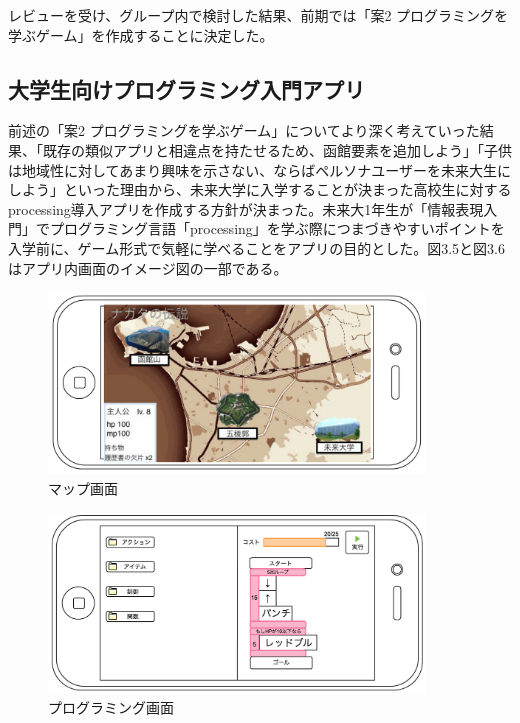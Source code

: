 \documentclass[openany,11pt,papersize]{jsbook}
\begin{document}
 \par レビューを受け、グループ内で検討した結果、前期では「案2 プログラミングを学ぶゲーム」を作成することに決定した。
 
 
 \subsection{大学生向けプログラミング入門アプリ}
\par 前述の「案2 プログラミングを学ぶゲーム」についてより深く考えていった結果、「既存の類似アプリと相違点を持たせるため、函館要素を追加しよう」「子供は地域性に対してあまり興味を示さない、ならばペルソナユーザーを未来大生にしよう」といった理由から、未来大学に入学することが決まった高校生に対するprocessing導入アプリを作成する方針が決まった。未来大1年生が「情報表現入門」でプログラミング言語「processing」を学ぶ際につまづきやすいポイントを入学前に、ゲーム形式で気軽に学べることをアプリの目的とした。図3.5と図3.6はアプリ内画面のイメージ図の一部である。

\begin{figure}[H]
\begin{center}
\includegraphics[width=10cm, bb=0 0 1182 571]{img/LengedOfN_map.png}
\end{center}
\caption{マップ画面}
\end{figure}

\begin{figure}[H]
\begin{center}
\includegraphics[width=10cm, bb=0 0 1173 563]{img/LegendOfN_programming.png}
\end{center}
\caption{プログラミング画面}
\end{figure}
\end{document}
